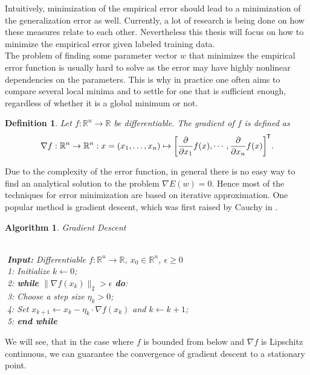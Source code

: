 \documentclass[11pt, a4paper]{article}
\newtheorem{definition}[theorem]{Definition}
\newtheorem{algorithm}[theorem]{Algorithm}
\newcommand{\R}{\mathbb{R}}
\newcommand*{\tr}{^{\mkern-1.5mu\mathsf{T}}}
\begin{document}
Intuitively, minimization of the empirical error should lead to a minimization of the generalization error as well. Currently, a lot of research is being done on how these measures relate to each other. Nevertheless this thesis will focus on how to minimize the empirical error given labeled training data. \\

The problem of finding some parameter vector $w$ that minimizes the empirical error function is usually hard to solve as the error may have highly nonlinear dependencies on the parameters. This is why in practice one often aims to compare several local minima and to settle for one that is sufficient enough, regardless of whether it is a global minimum or not.

\begin{definition}
Let $f: \R^n \to \R$ be differentiable. The gradient of $f$ is defined as
\[ \nabla f : \R^n \to \R^n : x = (x_1, \dots, x_n) \mapsto \bigg [ \frac{\partial}{\partial x_1} f(x), \cdots, \frac{\partial}{\partial x_n} f(x) \bigg ]\tr . \]
\end{definition}

Due to the complexity of the error function, in general there is no easy way to find an analytical solution to the problem $\nabla E(w) = 0$. Hence most of the techniques for error minimization are based on iterative approximation. One popular method is gradient descent, which was first raised by Cauchy in \cite{GD}.

\begin{algorithm}
\caption{Gradient Descent \textcolor{white}{$\Big |$}} \ \\
\textcolor{white}{$\Big |$}\textbf{Input:} Differentiable $f: \R^n \to \R$, $x_0 \in \R^n$, $\epsilon \geq 0$ \\
\textcolor{white}{$\Big |$}1: Initialize $k \leftarrow 0$; \\
\textcolor{white}{$\Big |$}2: \textbf{while} $ \big \| \nabla f(x_k) \big \|_2 > \epsilon $ \textbf{do}:\\
\textcolor{white}{$\Big |$}3: \quad Choose a step size $\eta_k > 0$; \\
\textcolor{white}{$\Big |$}4: \quad Set $x_{k+1} \leftarrow x_k - \eta_k \cdot \nabla f(x_k)$ and $k \leftarrow k+1$; \\
\textcolor{white}{$\Big |$}5: \textbf{end while}
\end {algorithm}

We will see, that in the case where $f$ is bounded from below and $\nabla f$ is Lipschitz continuous, we can guarantee the  convergence of gradient descent to a stationary point.
\end{document}
